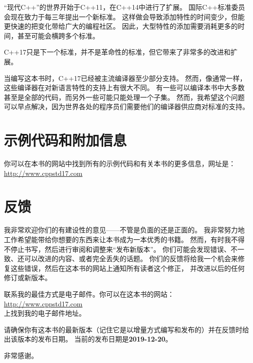 “现代C++”的世界开始于C++11，在C++14中进行了扩展。
国际C++标准委员会现在致力于每三年提出一个新标准。
这样做会导致添加特性的时间变少，但能更快速的把变化带给广大的编程社区。
因此，大型特性的添加需要消耗更多的时间，甚至可能会横跨多个标准。

C++17只是下一个标准，并不是革命性的标准，但它带来了非常多的改进和扩展。

当编写这本书时，C++17已经被主流编译器至少部分支持。
然而，像通常一样，这些编译器在对新语言特性的支持上有很大不同。
有一些可以编译本书中大多数甚至是全部的代码，而另外一些可能只能处理一个子集。
然而，我希望这个问题可以早点解决，因为世界各处的程序员们需要他们的编译器供应商对标准的支持。

\section{示例代码和附加信息}
你可以在本书的网站中找到所有的示例代码和有关本书的更多信息，网址是：\\
\hspace*{2em}\url{http://www.cppstd17.com}

\section{反馈}
我非常欢迎你们的有建设性的意见——不管是负面的还是正面的。
我非常努力地工作希望能带给你想要的东西来让本书成为一本优秀的书籍。
然而，有时我不得不停止书写，然后进行审阅和调整来“发布新版本”。
你们可能会发现错误、不一致、还可以改进的内容、或者完全丢失的话题。
你们的反馈将给我一个机会来修复这些错误，然后在这本书的网站上通知所有读者这个修正，
并改进以后的任何修订或新版本。

联系我的最佳方式是电子邮件。你可以在这本书的网站：\\
\hspace*{2em}\url{http://www.cppstd17.com}\\
上找到我的电子邮件地址。

请确保你有这本书的最新版本（记住它是以增量方式编写和发布的）并在反馈时给出该版本的发布日期。
当前的发布日期是\textbf{2019-12-20}。

非常感谢。
